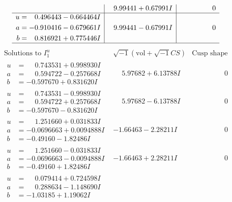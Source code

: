 \documentclass[1p]{elsarticle_modified}
\theoremstyle{definition}
\newcommand{\I}{\sqrt{-1}}
\begin{document}
$$\begin{array}{c|c|c}
 & \phantom{-}9.99441 + 0.67991 I & \phantom{-0.000000 } 0 \\ \hline\begin{aligned}
u &= \phantom{-}0.496443 - 0.664464 I \\
a &= -0.910416 - 0.679661 I \\
b &= \phantom{-}0.816921 + 0.775446 I\end{aligned}
 & \phantom{-}9.99441 - 0.67991 I & \phantom{-0.000000 } 0\\
 \hline 
 \end{array}$$\newpage$$\begin{array}{c|c|c}  
\text{Solutions to }I^u_{1}& \I (\text{vol} + \sqrt{-1}CS) & \text{Cusp shape}\\
 \hline 
\begin{aligned}
u &= \phantom{-}0.743531 + 0.998930 I \\
a &= \phantom{-}0.594722 - 0.257668 I \\
b &= -0.597670 + 0.831620 I\end{aligned}
 & \phantom{-}5.97682 + 6.13788 I & \phantom{-0.000000 } 0 \\ \hline\begin{aligned}
u &= \phantom{-}0.743531 - 0.998930 I \\
a &= \phantom{-}0.594722 + 0.257668 I \\
b &= -0.597670 - 0.831620 I\end{aligned}
 & \phantom{-}5.97682 - 6.13788 I & \phantom{-0.000000 } 0 \\ \hline\begin{aligned}
u &= \phantom{-}1.251660 + 0.031833 I \\
a &= -0.0696663 + 0.0094888 I \\
b &= -0.49160 - 1.82486 I\end{aligned}
 & -1.66463 - 2.28211 I & \phantom{-0.000000 } 0 \\ \hline\begin{aligned}
u &= \phantom{-}1.251660 - 0.031833 I \\
a &= -0.0696663 - 0.0094888 I \\
b &= -0.49160 + 1.82486 I\end{aligned}
 & -1.66463 + 2.28211 I & \phantom{-0.000000 } 0 \\ \hline\begin{aligned}
u &= \phantom{-}0.079414 + 0.724598 I \\
a &= \phantom{-}0.288634 - 1.148690 I \\
b &= -1.03185 + 1.19062 I\end{aligned}

\end{array}$$
\end{document}
